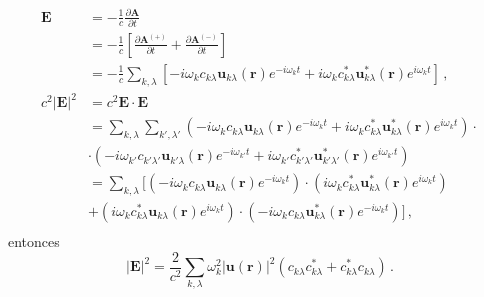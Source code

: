 \begin{align*}
  \mathbf{E}                 & = -\frac{1}{c} \frac{\partial \mathbf{A}}{\partial t}                                                                                                                                                                   \\
                             & =-\frac{1}{c}\left[ \frac{\partial \mathbf{A}^{(+)}}{\partial t} + \frac{\partial \mathbf{A}^{(-)}}{\partial t} \right]                                                                                                 \\
                             & = -\frac{1}{c} \sum_{k,\lambda} \left[ -i\omega_{k}c_{k\lambda} \mathbf{u}_{k\lambda} (\mathbf{r})e^{-i\omega_k t} +  i\omega_{k}c_{k\lambda}^* \mathbf{u}_{k\lambda}^* (\mathbf{r})e^{i\omega_{k} t} \right] \,,       \\
  c^2 \vert\mathbf{E}\vert^2 & = c^2 \mathbf{E} \cdot \mathbf{E}                                                                                                                                                                                       \\
                             & = \sum_{k,\lambda}\sum_{k',\lambda'}\left(-i\omega_{k}c_{k\lambda}\mathbf{u}_{k\lambda} (\mathbf{r})e^{-i\omega_{k}t} + i \omega_{k} c^{*}_{k\lambda}\mathbf{u}^{*}_{k\lambda}(\mathbf{r})e^{i\omega_{k}t} \right)\cdot \\
                             & \cdot \left(-i\omega_{k'}c_{k'\lambda'}\mathbf{u}_{k'\lambda} (\mathbf{r})e^{-i\omega_{k'}t} + i \omega_{k'} c^{*}_{k'\lambda'}\mathbf{u}^{*}_{k'\lambda'}(\mathbf{r})e^{i\omega_{k'}t} \right)                         \\
                             & = \sum_{k,\lambda} \Big[ \left(-i\omega_{k}c_{k\lambda} \mathbf{u}_{k\lambda} (\mathbf{r})e^{-i\omega_k t}\right)\cdot \left( i\omega_{k}c_{k\lambda}^* \mathbf{u}_{k\lambda}^* (\mathbf{r})e^{i\omega_{k} t} \right)   \\
                             & +  \left(i\omega_{k}c_{k\lambda}^* \mathbf{u}_{k\lambda} (\mathbf{r})e^{i\omega_{k} t}\right)\cdot \left(-i\omega_{k}c_{k\lambda} \mathbf{u}_{k\lambda}^* (\mathbf{r})e^{-i\omega_k t}\right) \Big]\,,                  \\
\end{align*}
entonces
\begin{equation}
  \label{EM.18}
  \vert\mathbf{E}\vert^2 = \frac{2}{c^2}\sum_{k,\lambda} \omega_{k}^2  |\mathbf{u}(\mathbf{r})|^2 \left( c_{k\lambda} c_{k\lambda}^* + c_{k\lambda}^* c_{k\lambda} \right) \,.
\end{equation}
